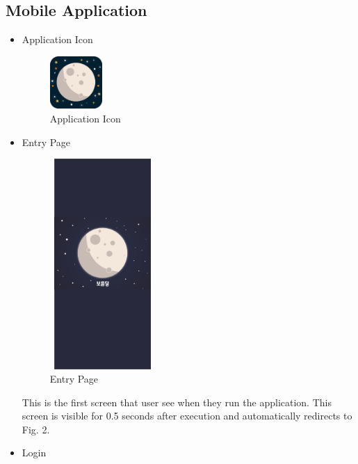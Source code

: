 \documentclass[conference]{IEEEtran}
\begin{document}
\subsection{Mobile Application}
\begin{itemize}
\setlength{\parindent}{2ex}
    \item Application Icon
    \begin{figure}[htbp]
    \includegraphics[width=2cm, height=2cm, center]{icon.png}
    \caption{Application Icon}
    \label{fig : Icon}
    \end{figure}
    
    \item Entry Page
    \begin{figure}[htbp]
    \includegraphics[width=4cm, height=8cm, center]{EntryPage.png}
    \caption{Entry Page}
    \label{fig : Entry Page}
    \end{figure}
    
    This is the first screen that user see when they run the application. This screen is visible for 0.5 seconds after execution and automatically redirects to Fig. 2.
    \item Login
    

\end{itemize}
\end{document}
